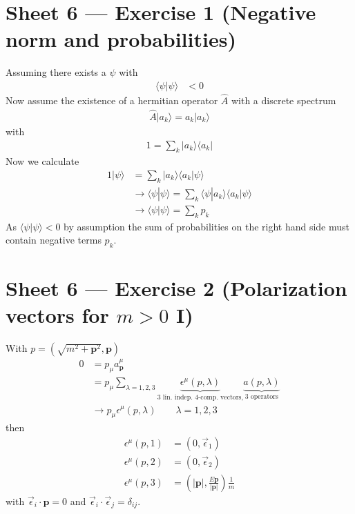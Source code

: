 \documentclass[10pt,a4paper]{report}
\theoremstyle{definition}
\begin{document}
\newpage

\section{Sheet 6 — Exercise 1 (Negative norm and probabilities)}
Assuming there exists a $\psi$ with 
\begin{align}
\langle\psi|\psi\rangle&<0
\end{align}
Now assume the existence of a hermitian operator $\hat{A}$ with a discrete spectrum 
\begin{align}
\hat{A}|a_k\rangle=a_k|a_k\rangle
\end{align}
with
\begin{align}
1=\sum_k|a_k\rangle\langle a_k|
\end{align}
Now we calculate
\begin{align}
1|\psi\rangle&=\sum_k|a_k\rangle\langle a_k|\psi\rangle\\
&\rightarrow\langle\psi|\psi\rangle=\sum_k\langle\psi|a_k\rangle\langle a_k|\psi\rangle\\
&\rightarrow\langle\psi|\psi\rangle=\sum_kp_k
\end{align}
As $\langle\psi|\psi\rangle<0$ by assumption the sum of  probabilities on the right hand side must contain negative terms $p_k$.

\section{Sheet 6 — Exercise 2 (Polarization vectors for $m>0$ I)}

With $p=(\sqrt{m^2+\mathbf{p}^2},\mathbf{p})$
\begin{align}
0
&=p_\mu a_\mathbf{p}^\mu\\
&=p_\mu \sum_{\lambda=1,2,3}\underbrace{\epsilon^\mu(p,\lambda)}_\text{3 lin. indep. 4-comp. vectors,}\underbrace{a(p,\lambda)}_\text{3 operators}\\
&\rightarrow p_\mu\epsilon^\mu(p,\lambda)\qquad\lambda=1,2,3
\end{align}
then
\begin{align}
\epsilon^\mu(p,1)&=(0,\vec{\epsilon}_1)\\
\epsilon^\mu(p,2)&=(0,\vec{\epsilon}_2)\\
\epsilon^\mu(p,3)&=\left(|\mathbf{p}|,\frac{E\mathbf{p}}{|\mathbf{p}|}\right)\frac{1}{m}
\end{align}
with $\vec{\epsilon}_i\cdot\mathbf{p}=0$ and $\vec{\epsilon}_i\cdot\vec{\epsilon}_j=\delta_{ij}$.
\end{document}
